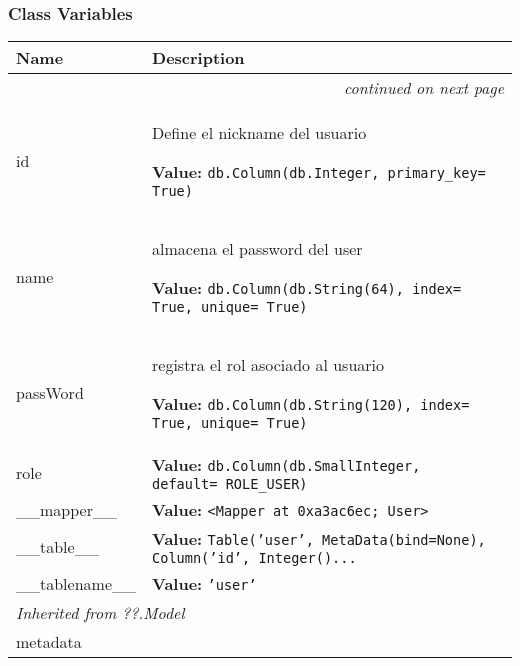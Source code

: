 
  \subsubsection{Class Variables}

    \vspace{-1cm}
\hspace{\varindent}\begin{longtable}{|p{\varnamewidth}|p{\vardescrwidth}|l}
\cline{1-2}
\cline{1-2} \centering \textbf{Name} & \centering \textbf{Description}& \\
\cline{1-2}
\endhead\cline{1-2}\multicolumn{3}{r}{\small\textit{continued on next page}}\\\endfoot\cline{1-2}
\endlastfoot\raggedright i\-d\- & \raggedright Define el nickname del usuario

\textbf{Value:} 
{\tt db.Column(db.Integer, primary\_key= True)}&\\
\cline{1-2}
\raggedright n\-a\-m\-e\- & \raggedright almacena el password del user

\textbf{Value:} 
{\tt db.Column(db.String(64), index= True, unique= True)}&\\
\cline{1-2}
\raggedright p\-a\-s\-s\-W\-o\-r\-d\- & \raggedright registra el rol asociado al usuario

\textbf{Value:} 
{\tt db.Column(db.String(120), index= True, unique= True)}&\\
\cline{1-2}
\raggedright r\-o\-l\-e\- & \raggedright \textbf{Value:} 
{\tt db.Column(db.SmallInteger, default= ROLE\_USER)}&\\
\cline{1-2}
\raggedright \_\-\_\-m\-a\-p\-p\-e\-r\-\_\-\_\- & \raggedright \textbf{Value:} 
{\tt {\textless}Mapper at 0xa3ac6ec; User{\textgreater}}&\\
\cline{1-2}
\raggedright \_\-\_\-t\-a\-b\-l\-e\-\_\-\_\- & \raggedright \textbf{Value:} 
{\tt Table('user', MetaData(bind=None), Column('id', Integer()\texttt{...}}&\\
\cline{1-2}
\raggedright \_\-\_\-t\-a\-b\-l\-e\-n\-a\-m\-e\-\_\-\_\- & \raggedright \textbf{Value:} 
{\tt \texttt{'}\texttt{user}\texttt{'}}&\\
\cline{1-2}
\multicolumn{2}{|l|}{\textit{Inherited from ??.Model}}\\
\multicolumn{2}{|p{\varwidth}|}{\raggedright metadata}\\
\cline{1-2}
\end{longtable}

